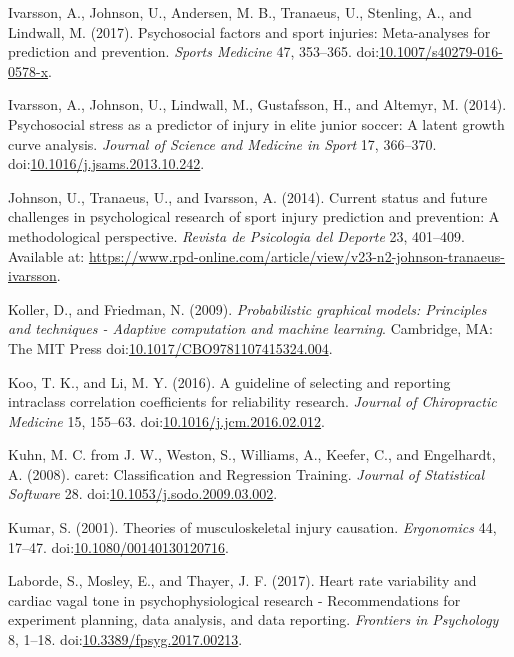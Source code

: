 \documentclass[
  english,
  man,floatsintext]{apa6}
\newlength{\cslhangindent}
\newenvironment{cslreferences}%
  {\setlength{\parindent}{0pt}%
  \everypar{\setlength{\hangindent}{\cslhangindent}}\ignorespaces}%
  {\par}
\begin{document}
\begin{cslreferences}
\leavevmode\hypertarget{ref-Ivarsson2017}{}%
Ivarsson, A., Johnson, U., Andersen, M. B., Tranaeus, U., Stenling, A., and Lindwall, M. (2017). Psychosocial factors and sport injuries: Meta-analyses for prediction and prevention. \emph{Sports Medicine} 47, 353--365. doi:\href{https://doi.org/10.1007/s40279-016-0578-x}{10.1007/s40279-016-0578-x}.

\leavevmode\hypertarget{ref-Ivarsson2014}{}%
Ivarsson, A., Johnson, U., Lindwall, M., Gustafsson, H., and Altemyr, M. (2014). Psychosocial stress as a predictor of injury in elite junior soccer: A latent growth curve analysis. \emph{Journal of Science and Medicine in Sport} 17, 366--370. doi:\href{https://doi.org/10.1016/j.jsams.2013.10.242}{10.1016/j.jsams.2013.10.242}.

\leavevmode\hypertarget{ref-Johnson2014}{}%
Johnson, U., Tranaeus, U., and Ivarsson, A. (2014). Current status and future challenges in psychological research of sport injury prediction and prevention: A methodological perspective. \emph{Revista de Psicologia del Deporte} 23, 401--409. Available at: \url{https://www.rpd-online.com/article/view/v23-n2-johnson-tranaeus-ivarsson}.

\leavevmode\hypertarget{ref-Koller2009}{}%
Koller, D., and Friedman, N. (2009). \emph{Probabilistic graphical models: Principles and techniques - Adaptive computation and machine learning}. Cambridge, MA: The MIT Press doi:\href{https://doi.org/10.1017/CBO9781107415324.004}{10.1017/CBO9781107415324.004}.

\leavevmode\hypertarget{ref-Koo2016}{}%
Koo, T. K., and Li, M. Y. (2016). A guideline of selecting and reporting intraclass correlation coefficients for reliability research. \emph{Journal of Chiropractic Medicine} 15, 155--63. doi:\href{https://doi.org/10.1016/j.jcm.2016.02.012}{10.1016/j.jcm.2016.02.012}.

\leavevmode\hypertarget{ref-Kuhn2008}{}%
Kuhn, M. C. from J. W., Weston, S., Williams, A., Keefer, C., and Engelhardt, A. (2008). caret: Classification and Regression Training. \emph{Journal of Statistical Software} 28. doi:\href{https://doi.org/10.1053/j.sodo.2009.03.002}{10.1053/j.sodo.2009.03.002}.

\leavevmode\hypertarget{ref-Kumar2001}{}%
Kumar, S. (2001). Theories of musculoskeletal injury causation. \emph{Ergonomics} 44, 17--47. doi:\href{https://doi.org/10.1080/00140130120716}{10.1080/00140130120716}.

\leavevmode\hypertarget{ref-Laborde2017}{}%
Laborde, S., Mosley, E., and Thayer, J. F. (2017). Heart rate variability and cardiac vagal tone in psychophysiological research - Recommendations for experiment planning, data analysis, and data reporting. \emph{Frontiers in Psychology} 8, 1--18. doi:\href{https://doi.org/10.3389/fpsyg.2017.00213}{10.3389/fpsyg.2017.00213}.


\end{cslreferences}
\end{document}
